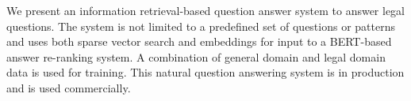 We present an information retrieval-based question answer system to answer legal questions. The system is not limited to a predefined set of questions or patterns and uses both sparse vector search and embeddings for input to a BERT-based answer re-ranking system. A combination of general domain and legal domain data is used for training.  This natural question answering system is in production and is used commercially.
